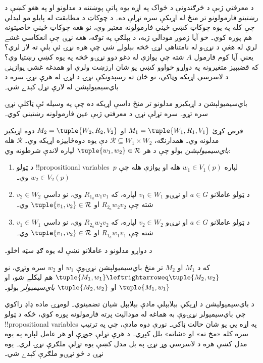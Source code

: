 \documentclass[../../../include/open-logic-section]{subfiles}
\begin{document}


د معرفتي ژبې د څرګندونې د ځواک په اړه يوه پاتې پوښتنه د مدلونو او
په هغو کښې د رښتينو فارمولونو تر منځ له اړيکې سره تړلې ده۔ د چوکاټ
د مطابقت له پايلو مو ليدلي چې کله په يوه چوکاټ کښې ځينې فارمولونه
معتبر وي، نو هغه چوکاټ ځينې خاصيتونه هم پوره کوي۔ خو آيا زموږ
مودالي ژبه، د بېلګې په توګه، هغه نړۍ چې انعکاسي غشے لري له
هغې د نړۍو له نامتناهي لړۍ څخه بېلولے شي چې هره نړۍ ئې بلې ته
لار لري؟ يعنې آيا کوم فارمول $A$ شته چې يوازې له دغو دوو نړۍو
څخه په يوه کښې رښتيا وي؟ که قضيېيز متغيرونه په دواړو خواوو کښې
يو شان ارزښت ولري او همدغه غشي يوازينۍ د لاسرسي اړيکه وټاکي، نو
ځان ته رسېدونکې نړۍ د لړۍ له هرې نړۍ سره د باي‌سيميولېشن له لارې
تړل کېدے شي۔

باي‌سيميولېشن د اړيکيزو مدلونو تر منځ داسې اړيکه ده چې په وسيله
ئې ټاکلې نړۍ سره تړو۔ سره تړلې نړۍ د معرفتي ژبې عين فارمولونه
رښتيني کوي۔

\begin{defn}
فرض کړئ $M_1 = \tuple{W_1, R_1, V_1}$ او $M_2 = \tuple{W_2, R_2, V_2}$
دوه اړيکيز مدلونه وي۔ همدارنګه، $\mathcal{R} \subseteq W_1 \times W_2$
دې يوه دوه‌ځاييزه اړيکه وي۔ $\mathcal{R}$ هله
\emph{باي‌سيميولېشن} بولو چې د هر $\tuple{w_1, w_2} \in \mathcal{R}$
لپاره لاندې شرطونه وي:

\begin{enumerate}
  \item د ټولو !!{propositional variable}s~$p$ لپاره
  $w_1 \in V_1(p)$ هله او يوازې هله چې $w_2 \in V_2(p)$ وي۔
  \item د ټولو عاملانو $a \in G$ او نړۍو $v_1 \in W_1$ لپاره، که
  $R_{1_a} w_1 v_1$ وي، نو داسې $v_2 \in W_2$ شته چې
  $R_{2_a} w_2 v_2$ او $\tuple{v_1, v_2} \in
  \mathcal{R}$ وي۔
  \item د ټولو عاملانو $a \in G$ او نړۍو $v_2 \in W_2$ لپاره، که
   $R_{2_a} w_2 v_2$ وي، نو داسې $v_1 \in W_1$ شته چې
   $R_{1_a} w_1 v_1$ او $\tuple{v_1, v_2} \in
   \mathcal{R}$ وي۔
\end{enumerate}
د دواړو مدلونو د عاملانو نښې له يوه ګډ سټه اخلو۔

که د $M_1$ او $M_2$ تر منځ باي‌سيميولېشن نړۍوې $w_1$ او $w_2$
سره وتړي، نو $\tuple{M_1, w_1} \leftrightarroweq
\tuple{M_2, w_2}$ هم ليکلے شو، او $\tuple{M_1, w_1}$ او
$\tuple{M_2, w_2}$ \emph{باي‌سيميولر} بولو۔
\end{defn}

د باي‌سيميولېشن د اړيکې بېلابېلې مادې بېلابېل شيان تضمينوي۔
لومړۍ ماده ډاډ راکوي چې باي‌سيميولر نړۍوې به هماغه له موداليت
پرته فارمولونه پوره کوي، ځکه د ټولو !!{propositional variable}s
په اړه يې يو شان حالت ټاکي۔ نورې دوه مادې، چې په ترتيب سره کله
«مخ ته» او «شاته» بلل کېږي۔ د هرې تړلې جوړې او هر عامل لپاره
په يوه مدل کښې هره د لاسرسي وړ نړۍ په بل مدل کښې يوه تړلې
ملګرې نړۍ لري۔ يوه نړۍ د څو نړۍو ملګرې کېدے شي۔
\end{document}
